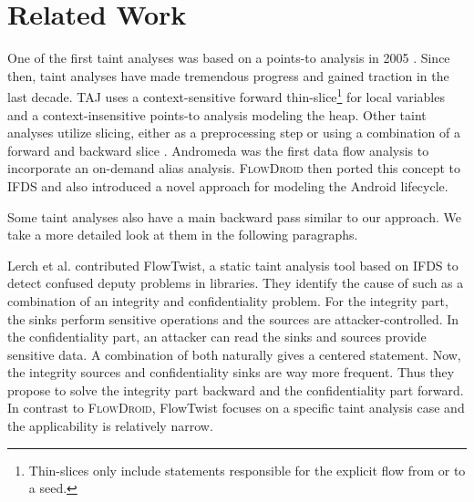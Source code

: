 \documentclass[../draft.tex]{subfiles}
\begin{document}
    \chapter{Related Work}\label{c:relatedwork}
    One of the first taint analyses was based on a points-to analysis in 2005 \cite{Livshits2005}. Since then, taint analyses have made tremendous progress and gained traction in the last decade.
    TAJ\cite{Tripp2009} uses a context-sensitive forward thin-slice\footnote{Thin-slices only include statements responsible for the explicit flow from or to a seed.} for local variables and a context-insensitive points-to analysis modeling the heap.
    Other taint analyses utilize slicing, either as a preprocessing step \cite{Zhao2020} or using a combination of a forward and backward slice \cite{Titze2015, Feichtner2018}.
    Andromeda\cite{Tripp2013} was the first data flow analysis to incorporate an on-demand alias analysis.
    \textsc{FlowDroid}\cite{Arzt2014} then ported this concept to IFDS and also introduced a novel approach for modeling the Android lifecycle.

    Some taint analyses also have a main backward pass similar to our approach. We take a more detailed look at them in the following paragraphs.

    Lerch et al.\cite{Lerch2014} contributed FlowTwist, a static taint analysis tool based on IFDS to detect confused deputy problems\footnotemark{} in libraries.
    They identify the cause of such as a combination of an integrity and confidentiality problem.
    For the integrity part, the sinks perform sensitive operations and the sources are attacker-controlled.
    In the confidentiality part, an attacker can read the sinks and sources provide sensitive data.
    A combination of both naturally gives a centered statement.
    Now, the integrity sources and confidentiality sinks are way more frequent.
    Thus they propose to solve the integrity part backward and the confidentiality part forward.
    In contrast to \textsc{FlowDroid}, FlowTwist focuses on a specific taint analysis case and the applicability is relatively narrow.
\end{document}
